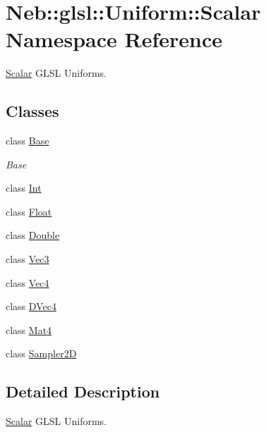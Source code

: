 \hypertarget{namespaceNeb_1_1glsl_1_1Uniform_1_1Scalar}{\section{\-Neb\-:\-:glsl\-:\-:\-Uniform\-:\-:\-Scalar \-Namespace \-Reference}
\label{namespaceNeb_1_1glsl_1_1Uniform_1_1Scalar}
}


\hyperlink{namespaceNeb_1_1glsl_1_1Uniform_1_1Scalar}{\-Scalar} \-G\-L\-S\-L \-Uniforms.  


\subsection*{\-Classes}
\begin{DoxyCompactItemize}
\item 
class \hyperlink{classNeb_1_1glsl_1_1Uniform_1_1Scalar_1_1Base}{\-Base}
\begin{DoxyCompactList}\small\item\em \-Base \end{DoxyCompactList}\item 
class \hyperlink{classNeb_1_1glsl_1_1Uniform_1_1Scalar_1_1Int}{\-Int}
\item 
class \hyperlink{classNeb_1_1glsl_1_1Uniform_1_1Scalar_1_1Float}{\-Float}
\item 
class \hyperlink{classNeb_1_1glsl_1_1Uniform_1_1Scalar_1_1Double}{\-Double}
\item 
class \hyperlink{classNeb_1_1glsl_1_1Uniform_1_1Scalar_1_1Vec3}{\-Vec3}
\item 
class \hyperlink{classNeb_1_1glsl_1_1Uniform_1_1Scalar_1_1Vec4}{\-Vec4}
\item 
class \hyperlink{classNeb_1_1glsl_1_1Uniform_1_1Scalar_1_1DVec4}{\-D\-Vec4}
\item 
class \hyperlink{classNeb_1_1glsl_1_1Uniform_1_1Scalar_1_1Mat4}{\-Mat4}
\item 
class \hyperlink{classNeb_1_1glsl_1_1Uniform_1_1Scalar_1_1Sampler2D}{\-Sampler2\-D}
\end{DoxyCompactItemize}


\subsection{\-Detailed \-Description}
\hyperlink{namespaceNeb_1_1glsl_1_1Uniform_1_1Scalar}{\-Scalar} \-G\-L\-S\-L \-Uniforms. 